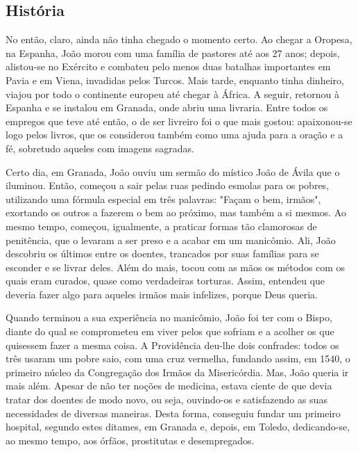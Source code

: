 \documentclass[18pt]{article}
\begin{document}
\begin{justify}

 \begin{center}
  \section{História}\label{sec:História} %
 \end{center}

No então, claro, ainda não tinha chegado o momento certo. Ao chegar a Oropesa, na Espanha, João morou com uma família de pastores até aos 27 anos; depois, alistou-se no Exército e combateu pelo menos duas batalhas importantes em Pavia e em Viena, invadidas pelos Turcos. Mais tarde, enquanto tinha dinheiro, viajou por todo o continente europeu até chegar à África. A seguir, retornou à Espanha e se instalou em Granada, onde abriu uma livraria. Entre todos os empregos que teve até então, o de ser livreiro foi o que mais gostou: apaixonou-se logo pelos livros, que os considerou também como uma ajuda para a oração e a fé, sobretudo aqueles com imagens sagradas.

Certo dia, em Granada, João ouviu um sermão do místico João de Ávila que o iluminou. Então, começou a sair pelas ruas pedindo esmolas para os pobres, utilizando uma fórmula especial em três palavras: "Façam o bem, irmãos", exortando os outros a fazerem o bem ao próximo, mas também a si mesmos. Ao mesmo tempo, começou, igualmente, a praticar formas tão clamorosas de penitência, que o levaram a ser preso e a acabar em um manicômio. Ali, João descobriu os últimos entre os doentes, trancados por suas famílias para se esconder e se livrar deles. Além do mais, tocou com as mãos os métodos com os quais eram curados, quase como verdadeiras torturas. Assim, entendeu que deveria fazer algo para aqueles irmãos mais infelizes, porque Deus queria.

Quando terminou a sua experiência no manicômio, João foi ter com o Bispo, diante do qual se comprometeu em viver pelos que sofriam e a acolher os que quisessem fazer a mesma coisa. A Providência deu-lhe dois confrades: todos os três usaram um pobre saio, com uma cruz vermelha, fundando assim, em 1540, o primeiro núcleo da Congregação dos Irmãos da Misericórdia. Mas, João queria ir mais além. Apesar de não ter noções de medicina, estava ciente de que devia tratar dos doentes de modo novo, ou seja, ouvindo-os e satisfazendo as suas necessidades de diversas maneiras. Desta forma, conseguiu fundar um primeiro hospital, segundo estes ditames, em Granada e, depois, em Toledo, dedicando-se, ao mesmo tempo, aos órfãos, prostitutas e desempregados.


\end{justify}
\end{document}
